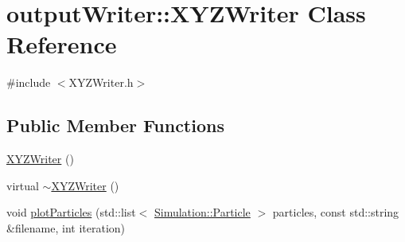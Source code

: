 \hypertarget{classoutputWriter_1_1XYZWriter}{\section{output\-Writer\-:\-:X\-Y\-Z\-Writer Class Reference}
\label{classoutputWriter_1_1XYZWriter}
}


{\ttfamily \#include $<$X\-Y\-Z\-Writer.\-h$>$}

\subsection*{Public Member Functions}
\begin{DoxyCompactItemize}
\item 
\hyperlink{classoutputWriter_1_1XYZWriter_a73b1eacd622152993f2fa6c181e69c8a}{X\-Y\-Z\-Writer} ()
\item 
virtual \hyperlink{classoutputWriter_1_1XYZWriter_ad3fe6dbb5e1aa5bdeffcc9986795309b}{$\sim$\-X\-Y\-Z\-Writer} ()
\item 
void \hyperlink{classoutputWriter_1_1XYZWriter_ac9d5403a215f96eb917866a3f352e36e}{plot\-Particles} (std\-::list$<$ \hyperlink{classSimulation_1_1Particle}{Simulation\-::\-Particle} $>$ particles, const std\-::string \&filename, int iteration)
\end{DoxyCompactItemize}


